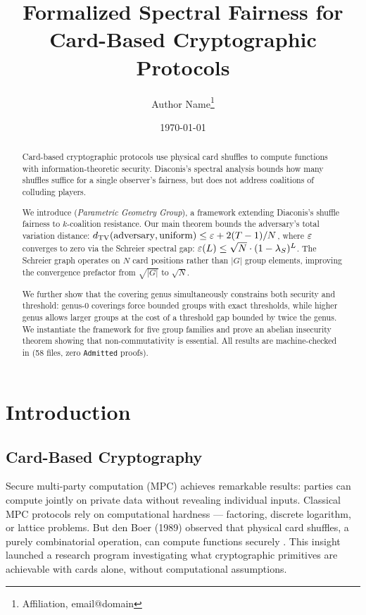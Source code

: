 \documentclass[11pt,a4paper]{article}
\title{Formalized Spectral Fairness for Card-Based Cryptographic Protocols}
\author{
  Author Name\footnote{Affiliation, email@domain}
}
\date{\today}
\begin{document}
\maketitle

\begin{abstract}

Card-based cryptographic protocols use physical card shuffles to compute functions with information-theoretic security.
Diaconis's spectral analysis bounds how many shuffles suffice for a single observer's fairness, but does not address coalitions of colluding players.

We introduce \pgg (\textit{Parametric Geometry Group}), a framework extending Diaconis's shuffle fairness to $k$-coalition resistance.
Our main theorem bounds the adversary's total variation distance: $d_{\mathrm{TV}}(\text{adversary}, \text{uniform}) \leq \varepsilon + 2(T-1)/N$, where $\varepsilon$ converges to zero via the Schreier spectral gap: $\varepsilon(L) \leq \sqrt{N} \cdot (1 - \lambda_S)^L$.
The Schreier graph operates on $N$ card positions rather than $|G|$ group elements, improving the convergence prefactor from $\sqrt{|G|}$ to $\sqrt{N}$.

We further show that the covering genus simultaneously constrains both security and threshold: genus-0 coverings force bounded groups with exact thresholds, while higher genus allows larger groups at the cost of a threshold gap bounded by twice the genus.
We instantiate the framework for five group families and prove an abelian insecurity theorem showing that non-commutativity is essential.
All results are machine-checked in \Rocq{} (58 files, zero \texttt{Admitted} proofs).

\end{abstract}

\section{Introduction}
\label{sec:intro}

\subsection*{Card-Based Cryptography}

Secure multi-party computation (MPC) achieves remarkable results: parties can compute jointly on private data without revealing individual inputs.
Classical MPC protocols rely on computational hardness — factoring, discrete logarithm, or lattice problems.
But den Boer (1989) observed that physical card shuffles, a purely combinatorial operation, can compute functions securely \cite{denBoer1989}.
This insight launched a research program investigating what cryptographic primitives are achievable with cards alone, without computational assumptions.
\end{document}
